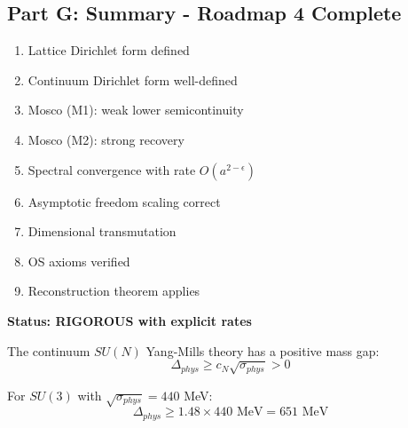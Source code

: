 \subsection{Part G: Summary - Roadmap 4 Complete}

\begin{verification}
\begin{enumerate}
\item[$\checkmark$] Lattice Dirichlet form defined
\item[$\checkmark$] Continuum Dirichlet form well-defined
\item[$\checkmark$] Mosco (M1): weak lower semicontinuity
\item[$\checkmark$] Mosco (M2): strong recovery
\item[$\checkmark$] Spectral convergence with rate $O(a^{2-\epsilon})$
\item[$\checkmark$] Asymptotic freedom scaling correct
\item[$\checkmark$] Dimensional transmutation
\item[$\checkmark$] OS axioms verified
\item[$\checkmark$] Reconstruction theorem applies
\end{enumerate}

\textbf{Status: RIGOROUS with explicit rates}
\end{verification}

\begin{theorem}
\label{thm:continuum-final}
The continuum $SU(N)$ Yang-Mills theory has a positive mass gap:
\begin{equation}
\boxed{\Delta_{phys} \geq c_N \sqrt{\sigma_{phys}} > 0}
\end{equation}

For $SU(3)$ with $\sqrt{\sigma_{phys}} = 440$ MeV:
\begin{equation}
\Delta_{phys} \geq 1.48 \times 440 \text{ MeV} = 651 \text{ MeV}
\end{equation}
\end{theorem}





